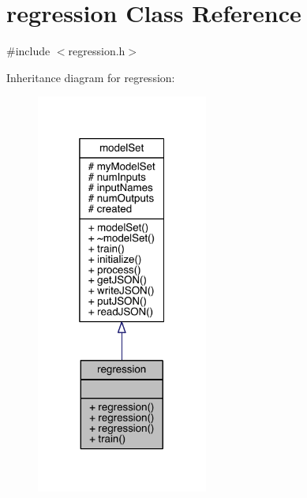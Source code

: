 \hypertarget{classregression}{}\section{regression Class Reference}
\label{classregression}


{\ttfamily \#include $<$regression.\+h$>$}



Inheritance diagram for regression\+:
\nopagebreak
\begin{figure}[H]
\begin{center}
\leavevmode
\includegraphics[width=160pt]{classregression__inherit__graph}
\end{center}
\end{figure}



